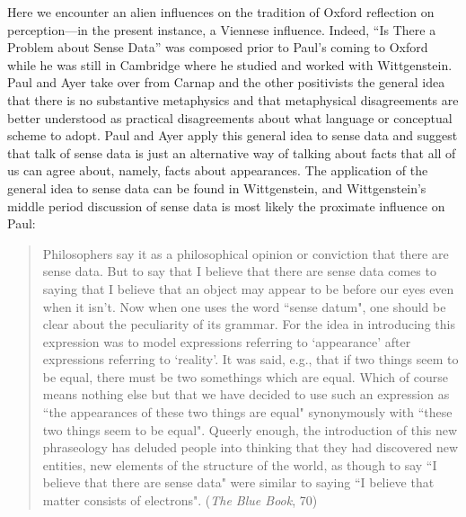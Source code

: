 \documentclass[11pt]{article}
\begin{document}
Here we encounter an alien influences on the tradition of Oxford reflection on perception---in the present instance, a Viennese influence. Indeed, ``Is There a Problem about Sense Data'' was composed prior to Paul's coming to Oxford while he was still in Cambridge where he studied and worked with Wittgenstein. 
Paul and Ayer take over from Carnap and the other positivists the general idea that there is no substantive metaphysics and that metaphysical disagreements are better understood as practical disagreements about what language or conceptual scheme to adopt. Paul and Ayer apply this general idea to sense data and suggest that talk of sense data is just an alternative way of talking about facts that all of us can agree about, namely, facts about appearances. The application of the general idea to sense data can be found in Wittgenstein, and Wittgenstein's middle period discussion of sense data is most likely the proximate influence on Paul:\begin{quote}
    Philosophers say it as a philosophical opinion or conviction that there are sense data. But to say that I believe that there are sense data comes to saying that I believe that an object may appear to be before our eyes even when it isn't. Now when one uses the word ``sense datum", one should be clear about the peculiarity of its grammar. For the idea in introducing this expression was to model expressions referring to `appearance' after expressions referring to `reality'. It was said, e.g., that if two things seem to be equal, there must be two somethings which are equal. Which of course means nothing else but that we have decided to use such an expression as ``the appearances of these two things are equal" synonymously with ``these two things seem to be equal". Queerly enough, the introduction of this new phraseology has deluded people into thinking that they had discovered new entities, new elements of the structure of the world, as though to say ``I believe that there are sense data" were similar to saying ``I believe that matter consists of electrons". (\emph{The Blue Book}, 70)
\end{quote}
\end{document}
